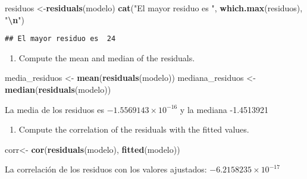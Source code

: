 \documentclass[
]{article}
\newenvironment{Shaded}{\begin{snugshade}}{\end{snugshade}}
\newcommand{\FunctionTok}[1]{\textcolor[rgb]{0.13,0.29,0.53}{\textbf{#1}}}
\newcommand{\NormalTok}[1]{#1}
\newcommand{\OtherTok}[1]{\textcolor[rgb]{0.56,0.35,0.01}{#1}}
\newcommand{\SpecialCharTok}[1]{\textcolor[rgb]{0.81,0.36,0.00}{\textbf{#1}}}
\newcommand{\StringTok}[1]{\textcolor[rgb]{0.31,0.60,0.02}{#1}}
\providecommand{\tightlist}{%
  \setlength{\itemsep}{0pt}\setlength{\parskip}{0pt}}
\begin{document}
\begin{Shaded}
\begin{Highlighting}[]
\NormalTok{residuos }\OtherTok{\textless{}{-}}\FunctionTok{residuals}\NormalTok{(modelo)}
\FunctionTok{cat}\NormalTok{(}\StringTok{"El mayor residuo es "}\NormalTok{, }\FunctionTok{which.max}\NormalTok{(residuos), }\StringTok{"}\SpecialCharTok{\textbackslash{}n}\StringTok{"}\NormalTok{)}
\end{Highlighting}
\end{Shaded}

\begin{verbatim}
## El mayor residuo es  24
\end{verbatim}

\begin{enumerate}
\def\labelenumi{(\alph{enumi})}
\setcounter{enumi}{2}
\tightlist
\item
  Compute the mean and median of the residuals.
\end{enumerate}

\begin{Shaded}
\begin{Highlighting}[]
\NormalTok{media\_residuos }\OtherTok{\textless{}{-}} \FunctionTok{mean}\NormalTok{(}\FunctionTok{residuals}\NormalTok{(modelo))}
\NormalTok{mediana\_residuos }\OtherTok{\textless{}{-}} \FunctionTok{median}\NormalTok{(}\FunctionTok{residuals}\NormalTok{(modelo))}
\end{Highlighting}
\end{Shaded}

La media de los residuos es \ensuremath{-1.5569143\times 10^{-16}} y la
mediana -1.4513921

\begin{enumerate}
\def\labelenumi{(\alph{enumi})}
\setcounter{enumi}{3}
\tightlist
\item
  Compute the correlation of the residuals with the fitted values.
\end{enumerate}

\begin{Shaded}
\begin{Highlighting}[]
\NormalTok{corr}\OtherTok{\textless{}{-}} \FunctionTok{cor}\NormalTok{(}\FunctionTok{residuals}\NormalTok{(modelo), }\FunctionTok{fitted}\NormalTok{(modelo))}
\end{Highlighting}
\end{Shaded}

La correlación de los residuos con los valores ajustados:
\ensuremath{-6.2158235\times 10^{-17}}
\end{document}
